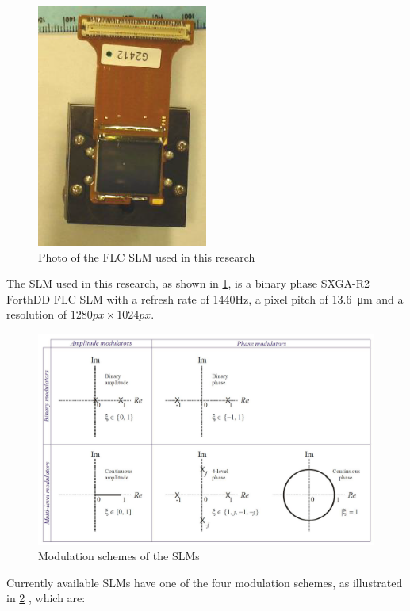 \begin{figure}[H]
  \centering
  \includegraphics[width=0.5\textwidth]{ForthDDPhoto.png}
  \caption{Photo of the FLC SLM used in this research \cite{Freeman2009}} \label{fig:ForthDDPhoto}
\end{figure}

The SLM used in this research, as shown in \cref{fig:ForthDDPhoto}, is a binary phase SXGA-R2 ForthDD FLC SLM with a refresh rate of 1440Hz, a pixel pitch of \SI{13.6}{\micro\metre} and a resolution of $1280px \times 1024px$.

\begin{figure}[H]
  \centering
  \includegraphics[width=1.0\textwidth]{modulation_loci.jpg}
  \caption{Modulation schemes of the SLMs \cite{Cable2006}} \label{fig:modulation_loci}
\end{figure}

Currently available SLMs have one of the four modulation schemes, as illustrated in \cref{fig:modulation_loci} \cite{Cable2006}, which are:

